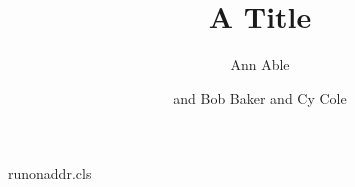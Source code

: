\begin{filecontents*}[overwrite]{runonaddr.cls}
\let\@author\@empty\renewcommand\author[2][]{\g@addto@macro\@author{#2 }}
\newcommand\address[2][]{\par{\small\ifx\relax#1\relax\else(#1) \fi #2} }
\def\affil#1{\par{\small #1}\par}
\def\inst#1{\textsuperscript{#1}}
\end{filecontents*}
\documentclass{runonaddr}

\title{A Title}
\author{Ann Able}
\address[\inst{2}]{Univ B, City}
More text.

\author{and Bob Baker and Cy Cole}
\maketitle
Body.

